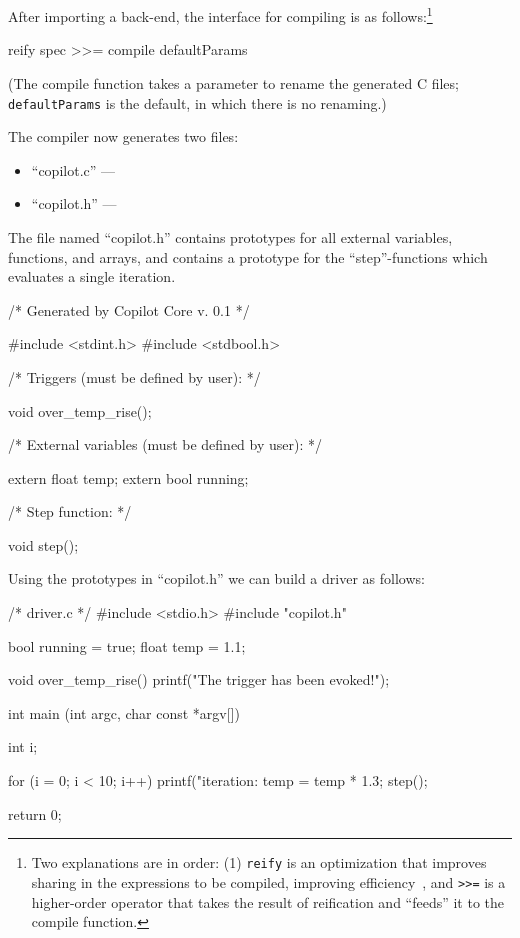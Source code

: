 \documentclass[]{article}
\theoremstyle{example}
\begin{document}
After importing a back-end, the interface for compiling is as
follows:\footnote{Two explanations are in order: (1) {\tt reify} is an
  optimization that improves sharing in the expressions to be compiled,
  improving efficiency~\cite{DSLExtract}, and {\tt >>=} is a higher-order
  operator that takes the result of reification and ``feeds'' it to the compile
  function.}
%
\begin{code}
reify spec >>= compile defaultParams
\end{code}
%
\noindent
(The compile function takes a parameter to rename the generated C files; {\tt
  defaultParams} is the default, in which there is no renaming.)

The compiler now generates two files:

\begin{itemize}
\item ``copilot.c'' --- 
\item ``copilot.h'' --- 
\end{itemize}

The file named ``copilot.h'' contains prototypes for all external variables, functions, and arrays,
and contains a prototype for the ``step''-functions which evaluates a single iteration.

\begin{code}
/* Generated by Copilot Core v. 0.1 */

#include <stdint.h>
#include <stdbool.h>

/* Triggers (must be defined by user): */

void over_temp_rise();

/* External variables (must be defined by user): */

extern float temp;
extern bool running;

/* Step function: */

void step();
\end{code}

Using the prototypes in ``copilot.h'' we can build a driver as follows:

\begin{code}
/* driver.c */
#include <stdio.h>
#include "copilot.h"

bool running = true;
float temp = 1.1;

void over_temp_rise()
{
  printf("The trigger has been evoked!\n");
}

int main (int argc, char const *argv[])
{
  int i;

  for (i = 0; i < 10; i++)
  {
    printf("iteration: %
    temp = temp * 1.3;
    step();
  }

  return 0;
}
\end{code}
\end{document}
